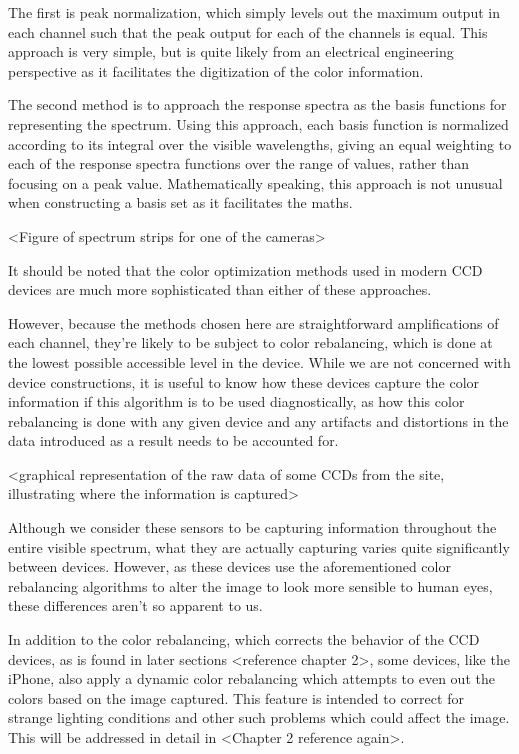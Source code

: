 The first is peak normalization, which simply levels out the maximum output in each channel such that the peak output for each of the channels is equal. This approach is very simple, but is quite likely from an electrical engineering perspective as it facilitates the digitization of the color information.

The second method is to approach the response spectra as the basis functions for representing the spectrum. Using this approach, each basis function is normalized according to its integral over the visible wavelengths, giving an equal weighting to each of the response spectra functions over the range of values, rather than focusing on a peak value. Mathematically speaking, this approach is not unusual when constructing a basis set as it facilitates the maths.

<Figure of spectrum strips for one of the cameras>

It should be noted that the color optimization methods used in modern CCD devices are much more sophisticated than either of these approaches.

However, because the methods chosen here are straightforward amplifications of each channel, they're likely to be subject to color rebalancing, which is done at the lowest possible accessible level in the device. While we are not concerned with device constructions, it is useful to know how these devices capture the color information if this algorithm is to be used diagnostically, as how this color rebalancing is done with any given device and any artifacts and distortions in the data introduced as a result needs to be accounted for.

<graphical representation of the raw data of some CCDs from the site, illustrating where the information is captured>

Although we consider these sensors to be capturing information throughout the entire visible spectrum, what they are actually capturing varies quite significantly between devices. However, as these devices use the aforementioned color rebalancing algorithms to alter the image to look more sensible to human eyes, these differences aren't so apparent to us.

In addition to the color rebalancing, which corrects the behavior of the CCD devices, as is found in later sections <reference chapter 2>, some devices, like the iPhone, also apply a dynamic color rebalancing which attempts to even out the colors based on the image captured. This feature is intended to correct for strange lighting conditions and other such problems which could affect the image. This will be addressed in detail in <Chapter 2 reference again>.


